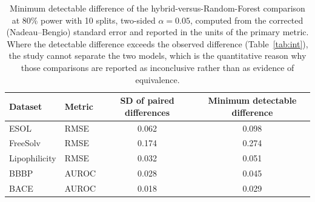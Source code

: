\begin{table}[H]
\caption{Minimum detectable difference of the hybrid-versus-Random-Forest comparison at 80\% power with 10 splits, two-sided $\alpha=0.05$, computed from the corrected (Nadeau--Bengio) standard error and reported in the units of the primary metric. Where the detectable difference exceeds the observed difference (Table~\ref{tab:int}), the study cannot separate the two models, which is the quantitative reason why those comparisons are reported as inconclusive rather than as evidence of equivalence.}\label{tab:mde}
\centering\footnotesize
\begin{tabular}{@{}llcc@{}}
\toprule
Dataset & Metric & SD of paired differences & Minimum detectable difference \\
\midrule
ESOL & RMSE & 0.062 & 0.098 \\
FreeSolv & RMSE & 0.174 & 0.274 \\
Lipophilicity & RMSE & 0.032 & 0.051 \\
BBBP & AUROC & 0.028 & 0.045 \\
BACE & AUROC & 0.018 & 0.029 \\
\bottomrule
\end{tabular}
\end{table}
